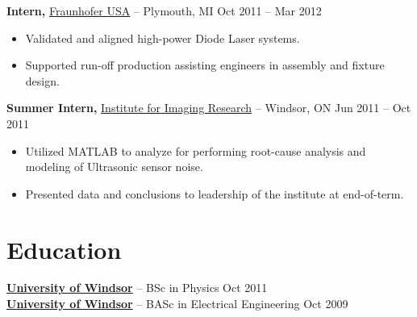 \documentclass[11pt]{article}       %
\begin{document}
\textbf{Intern,} \href{}{Fraunhofer USA} -- Plymouth, MI \hfill Oct 2011 -- Mar 2012 \\
\vspace{-9pt}
\begin{itemize}
  \item Validated and aligned high-power Diode Laser systems.
  \item Supported run-off production assisting engineers in assembly and fixture design.
\end{itemize}

\textbf{Summer Intern,} \href{}{Institute for Imaging Research} -- Windsor, ON \hfill Jun 2011 -- Oct 2011 \\
\vspace{-9pt}
\begin{itemize}
  \item Utilized MATLAB to analyze for performing root-cause analysis and modeling of Ultrasonic sensor noise.
  \item Presented data and conclusions to leadership of the institute at end-of-term.
\end{itemize}


\vspace{-18.5pt}

\section*{Education}
\textbf{\href{https://www.uwindsor.ca/}{University of Windsor}} -- BSc in Physics \hfill Oct 2011 \\
\textbf{\href{https://www.uwindsor.ca/}{University of Windsor}} -- BASc in Electrical Engineering \hfill Oct 2009
\end{document}
